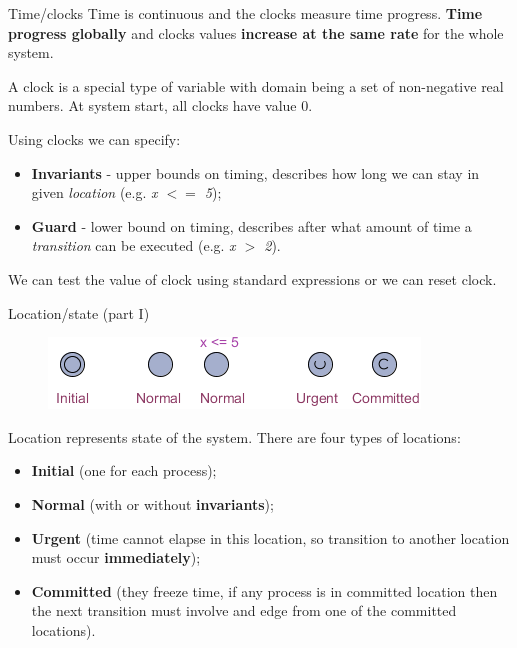 \documentclass{beamer}
\begin{document}
\begin{frame}{Time/clocks}
	Time is continuous and the clocks measure time progress. \textbf{Time progress globally} and clocks values \textbf{increase at the same rate} for the whole system.\newline
	
	A clock is a special type of variable with domain being a set of non-negative real numbers. At system start, all clocks have value 0.\newline
	
	Using clocks we can specify:
	\begin{itemize}
		\item \textbf{Invariants} - upper bounds on timing, describes how long we can stay in given \textit{location} (e.g. \textit{x $<=$ 5});
		\item \textbf{Guard} - lower bound on timing, describes after what amount of time a \textit{transition} can be executed (e.g. \textit{x $>$ 2}).
	\end{itemize}
	
	We can test the value of clock using standard expressions or we can reset clock.
\end{frame}

\begin{frame}{Location/state (part I)}
	\begin{figure}[H]
		\includegraphics[scale=1]{img/uppaal_locations.png}
	\end{figure}
	
	Location represents state of the system. There are four types of locations:
	\begin{itemize}
		\item \textbf{Initial} (one for each process);
		\item \textbf{Normal} (with or without \textbf{invariants});
		\item \textbf{Urgent} (time cannot elapse in this location, so transition to another location must occur \textbf{immediately});
		\item \textbf{Committed} (they freeze time, if any process is in committed location then the next transition must involve and edge from one of the committed locations).
	\end{itemize}
\end{frame}
\end{document}

